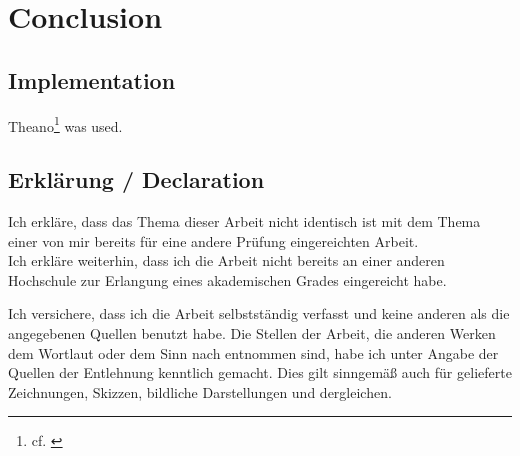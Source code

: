 \documentclass[11pt, a4paper]{article}
\begin{document}
\section{Conclusion}

\newpage

\begin{appendix}
	\section{Implementation}
	
	Theano\footnote{cf. \cite{theano}} was used.
	
\end{appendix}

\newpage

\listoffigures

\newpage

{}


\newpage

\thispagestyle{empty}

\begin{center}
\subsection*{Erklärung / Declaration}
\end{center}
\vspace{0.5cm}
Ich erkläre, dass das Thema dieser Arbeit nicht identisch ist mit dem Thema einer von mir bereits für eine andere Prüfung eingereichten Arbeit.\\
Ich erkläre weiterhin, dass ich die Arbeit nicht bereits an einer anderen Hochschule zur Erlangung eines akademischen Grades eingereicht habe.

\vspace{0.8cm}
Ich versichere, dass ich die Arbeit selbstständig verfasst und keine anderen als die angegebenen Quellen benutzt habe. Die Stellen der Arbeit, die anderen Werken dem Wortlaut oder dem Sinn nach entnommen sind, habe ich unter Angabe der Quellen der Entlehnung kenntlich gemacht. Dies gilt sinngemäß auch für gelieferte Zeichnungen, Skizzen, bildliche Darstellungen und dergleichen.
\end{document}
